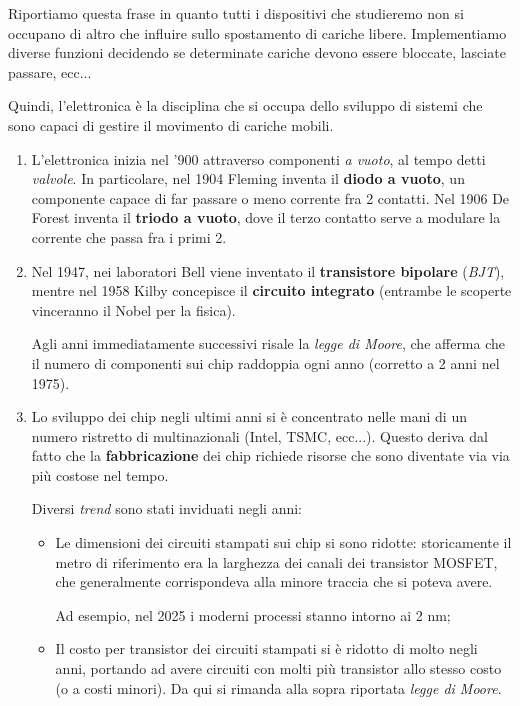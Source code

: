 \documentclass[a4paper,11pt]{article}
\begin{document}
Riportiamo questa frase in quanto tutti i dispositivi che studieremo non si occupano di altro che influire sullo spostamento di cariche libere.
Implementiamo diverse funzioni decidendo se determinate cariche devono essere bloccate, lasciate passare, ecc...

Quindi, l'elettronica è la disciplina che si occupa dello sviluppo di sistemi che sono capaci di gestire il movimento di cariche mobili.

\begin{enumerate}
	\item L'elettronica inizia nel '900 attraverso componenti \textit{a vuoto}, al tempo detti \textit{valvole}.
In particolare, nel 1904 Fleming inventa il \textbf{diodo a vuoto}, un componente capace di far passare o meno corrente fra 2 contatti.
Nel 1906 De Forest inventa il \textbf{triodo a vuoto}, dove il terzo contatto serve a modulare la corrente che passa fra i primi 2.
	\item Nel 1947, nei laboratori Bell viene inventato il \textbf{transistore bipolare} (\textit{BJT}), mentre nel 1958 Kilby concepisce il \textbf{circuito integrato} (entrambe le scoperte vinceranno il Nobel per la fisica).
		
		Agli anni immediatamente successivi risale la \textit{legge di Moore}, che afferma che il numero di componenti sui chip raddoppia ogni anno (corretto a 2 anni nel 1975).
	\item Lo sviluppo dei chip negli ultimi anni si è concentrato nelle mani di un numero ristretto di multinazionali (Intel, TSMC, ecc...). Questo deriva dal fatto che la \textbf{fabbricazione} dei chip richiede risorse che sono diventate via via più costose nel tempo.

		Diversi \textit{trend} sono stati inviduati negli anni:
		\begin{itemize}
			\item Le dimensioni dei circuiti stampati sui chip si sono ridotte: storicamente il metro di riferimento era la larghezza dei canali dei transistor MOSFET, che generalmente corrispondeva alla minore traccia che si poteva avere.

				Ad esempio, nel 2025 i moderni processi stanno intorno ai 2 nm;
			\item Il costo per transistor dei circuiti stampati si è ridotto di molto negli anni, portando ad avere circuiti con molti più transistor allo stesso costo (o a costi minori). Da qui si rimanda alla sopra riportata \textit{legge di Moore}. 


\end{itemize}
\end{enumerate}
\end{document}
